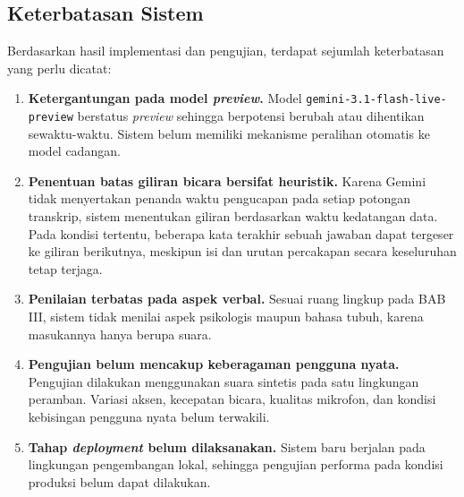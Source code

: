 \documentclass[12pt,a4paper,oneside]{report}
\begin{document}
\subsection{Keterbatasan Sistem}

Berdasarkan hasil implementasi dan pengujian, terdapat sejumlah keterbatasan
yang perlu dicatat:

\begin{enumerate}[leftmargin=*,itemsep=3pt]
  \item \textbf{Ketergantungan pada model \textit{preview}.} Model
        \texttt{gemini-3.1-flash-}\allowbreak\texttt{live-preview} berstatus
        \textit{preview}
        sehingga berpotensi berubah atau dihentikan sewaktu-waktu. Sistem
        belum memiliki mekanisme peralihan otomatis ke model cadangan.
  \item \textbf{Penentuan batas giliran bicara bersifat heuristik.} Karena
        Gemini tidak menyertakan penanda waktu pengucapan pada setiap potongan
        transkrip, sistem menentukan giliran berdasarkan waktu kedatangan
        data. Pada kondisi tertentu, beberapa kata terakhir sebuah jawaban
        dapat tergeser ke giliran berikutnya, meskipun isi dan urutan
        percakapan secara keseluruhan tetap terjaga.
  \item \textbf{Penilaian terbatas pada aspek verbal.} Sesuai ruang lingkup
        pada BAB III, sistem tidak menilai aspek psikologis maupun bahasa
        tubuh, karena masukannya hanya berupa suara.
  \item \textbf{Pengujian belum mencakup keberagaman pengguna nyata.}
        Pengujian dilakukan menggunakan suara sintetis pada satu lingkungan
        peramban. Variasi aksen, kecepatan bicara, kualitas mikrofon, dan
        kondisi kebisingan pengguna nyata belum terwakili.
  \item \textbf{Tahap \textit{deployment} belum dilaksanakan.} Sistem baru
        berjalan pada lingkungan pengembangan lokal, sehingga pengujian
        performa pada kondisi produksi belum dapat dilakukan.
\end{enumerate}
\end{document}
